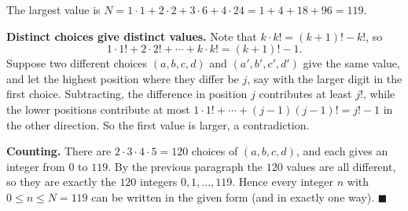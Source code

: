 The largest value is $N=1\cdot1+2\cdot2+3\cdot6+4\cdot24=1+4+18+96=\boxed{119}$.

\textbf{Distinct choices give distinct values.} Note that $k\cdot k!=(k+1)!-k!$, so
\[
1\cdot1!+2\cdot2!+\cdots+k\cdot k!=(k+1)!-1 .
\]
Suppose two different choices $(a,b,c,d)$ and $(a',b',c',d')$ give the same value, and let the highest position where they differ be $j$, say with the larger digit in the first choice. Subtracting, the difference in position $j$ contributes at least $j!$, while the lower positions contribute at most $1\cdot1!+\cdots+(j-1)(j-1)!=j!-1$ in the other direction. So the first value is larger, a contradiction.

\textbf{Counting.} There are $2\cdot3\cdot4\cdot5=120$ choices of $(a,b,c,d)$, and each gives an integer from $0$ to $119$. By the previous paragraph the $120$ values are all different, so they are exactly the $120$ integers $0,1,\dots,119$. Hence every integer $n$ with $0\le n\le N=119$ can be written in the given form (and in exactly one way). $\blacksquare$
